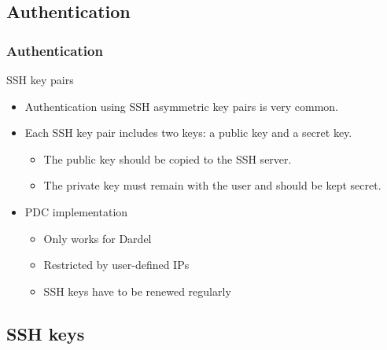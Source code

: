 \subsection{Authentication}
\begin{frame}[fragile]
\frametitle{Authentication}
\begin{exampleblock}{\large{SSH key pairs}}
\begin{itemize}
  \item Authentication using SSH asymmetric key pairs is very common.
  \item Each SSH key pair includes two keys: a public key and a secret key.
  \begin{itemize}
    \item The public key should be copied to the SSH server. 
    \item The private key must remain with the user and should be kept secret.
  \end{itemize}
  \item PDC implementation
  \begin{itemize}
    \item Only works for Dardel
    \item Restricted by user-defined IPs
    \item SSH keys have to be renewed regularly
  \end{itemize}
\end{itemize}
\end{exampleblock}

\end{frame}

\subsection*{SSH keys}

